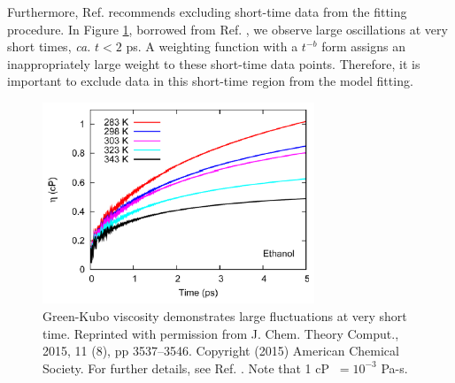 \documentclass[9pt,bestpractices]{livecoms}
\begin{document}
Furthermore, Ref. \cite{Zhang2015} recommends excluding short-time data from the fitting procedure. In Figure \ref{fig:ZhangFig4}, borrowed from Ref. \cite{Zhang2015}, we observe large oscillations at very short times, \textit{ca.} $t < 2$ ps. A weighting function with a $t^{-b}$ form assigns an inappropriately large weight to these short-time data points. Therefore, it is important to exclude data in this short-time region from the model fitting. 

\begin{figure}[htb!]
	\centering
	\includegraphics[width=3.2in]{ZhangFig4.png}
	\caption{Green-Kubo viscosity demonstrates large fluctuations at very short time. Reprinted with permission from J. Chem. Theory Comput., 2015, 11 (8), pp 3537–3546. Copyright (2015) American Chemical Society. For further details, see Ref. \cite{Zhang2015}. Note that 1 cP $\ = 10^{-3}$ Pa-s.}
	\label{fig:ZhangFig4}
\end{figure}  


\end{document}
